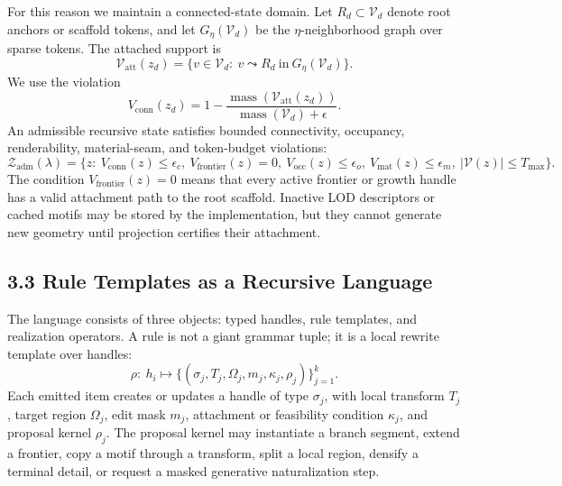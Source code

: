 For this reason we maintain a connected-state domain. Let \(R_d\subset
\mathcal V_d\) denote root anchors or scaffold tokens, and let
\(G_\eta(\mathcal V_d)\) be the \(\eta\)-neighborhood graph over sparse tokens.
The attached support is
\begin{equation}
\mathcal V_{\mathrm{att}}(z_d)=
\{v\in\mathcal V_d:\ v\leadsto R_d\ \mathrm{in}\ G_\eta(\mathcal V_d)\}.
\end{equation}
We use the violation
\begin{equation}
V_{\mathrm{conn}}(z_d)=
1-\frac{\operatorname{mass}(\mathcal V_{\mathrm{att}}(z_d))}
{\operatorname{mass}(\mathcal V_d)+\epsilon}.
\end{equation}
An admissible recursive state satisfies bounded connectivity, occupancy,
renderability, material-seam, and token-budget violations:
\begin{equation}
\mathcal Z_{\mathrm{adm}}(\lambda)=
\{z:\ V_{\mathrm{conn}}(z)\le\epsilon_c,\ 
V_{\mathrm{frontier}}(z)=0,\ 
V_{\mathrm{occ}}(z)\le\epsilon_o,\ 
V_{\mathrm{mat}}(z)\le\epsilon_m,\ 
|\mathcal V(z)|\le T_{\max}\}.
\end{equation}
The condition \(V_{\mathrm{frontier}}(z)=0\) means that every active frontier
or growth handle has a valid attachment path to the root scaffold. Inactive
LOD descriptors or cached motifs may be stored by the implementation, but they
cannot generate new geometry until projection certifies their attachment.

\subsection*{3.3 Rule Templates as a Recursive Language}

The language consists of three objects: typed handles, rule templates, and
realization operators. A rule is not a giant grammar tuple; it is a local
rewrite template over handles:
\begin{equation}
\rho:\ h_i\mapsto
\{(\sigma_j,T_j,\Omega_j,m_j,\kappa_j,\rho_j)\}_{j=1}^{k}.
\end{equation}
Each emitted item creates or updates a handle of type \(\sigma_j\), with local
transform \(T_j\), target region \(\Omega_j\), edit mask \(m_j\), attachment or
feasibility condition \(\kappa_j\), and proposal kernel \(\rho_j\). The
proposal kernel may instantiate a branch segment, extend a frontier, copy a
motif through a transform, split a local region, densify a terminal detail, or
request a masked generative naturalization step.

